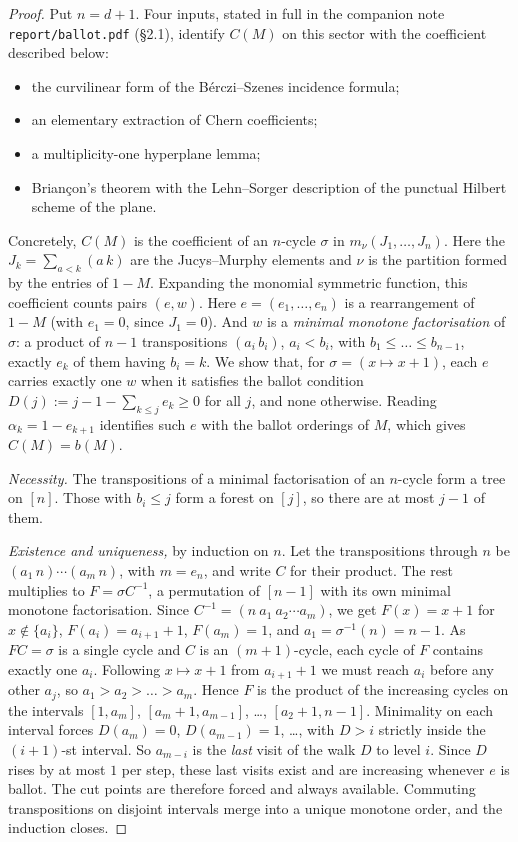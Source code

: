 \documentclass[11pt,a4paper]{article}
\theoremstyle{plain}
\theoremstyle{definition}
\theoremstyle{remark}
\begin{document}
\begin{proof}
Put $n = d+1$. Four inputs, stated in full in the companion note \texttt{report/ballot.pdf}
(\S2.1), identify $C(M)$ on this sector with the coefficient described below:
\begin{itemize}[nosep]
\item the curvilinear form of the B\'erczi--Szenes incidence formula;
\item an elementary extraction of Chern coefficients;
\item a multiplicity-one hyperplane lemma;
\item Brian\c{c}on's theorem with the Lehn--Sorger description of the punctual Hilbert scheme of the
  plane.
\end{itemize}
Concretely, $C(M)$ is the
coefficient of an $n$-cycle $\sigma$ in $m_\nu(J_1, \dots, J_n)$. Here the $J_k = \sum_{a<k}(a\,k)$ are the
Jucys--Murphy elements and $\nu$ is the partition formed by the entries of $1 - M$. Expanding the
monomial symmetric function, this coefficient counts pairs $(e, w)$. Here $e = (e_1, \dots, e_n)$
is a rearrangement of $1 - M$ (with $e_1 = 0$, since $J_1 = 0$). And $w$ is a \emph{minimal
monotone factorisation} of $\sigma$: a product of $n-1$ transpositions $(a_i\,b_i)$, $a_i < b_i$,
with $b_1 \le \dots \le b_{n-1}$, exactly $e_k$ of them having $b_i = k$. We show that, for
$\sigma = (x \mapsto x+1)$, each $e$ carries exactly one $w$ when it satisfies the ballot condition
$D(j) := j - 1 - \sum_{k \le j} e_k \ge 0$ for all $j$, and none otherwise. Reading $\alpha_k = 1 -
e_{k+1}$ identifies such $e$ with the ballot orderings of $M$, which gives $C(M) = b(M)$.

\emph{Necessity.} The transpositions of a minimal factorisation of an $n$-cycle form a tree on
$[n]$. Those with $b_i \le j$ form a forest on $[j]$, so there are at most $j-1$ of them.

\emph{Existence and uniqueness,} by induction on $n$. Let the transpositions through $n$ be $(a_1\,n)
\cdots (a_m\,n)$, with $m = e_n$, and write $C$ for their product. The rest multiplies to
$F = \sigma C^{-1}$, a permutation of $[n-1]$ with its own minimal monotone factorisation. Since
$C^{-1} = (n\ a_1\ a_2 \cdots a_m)$, we get $F(x) = x+1$ for $x \notin \{a_i\}$, $F(a_i) = a_{i+1} + 1$,
$F(a_m) = 1$, and $a_1 = \sigma^{-1}(n) = n-1$. As $FC = \sigma$ is a single cycle and $C$ is an
$(m+1)$-cycle, each cycle of $F$ contains exactly one $a_i$. Following $x \mapsto x+1$ from
$a_{i+1}+1$ we must reach $a_i$ before any other $a_j$, so $a_1 > a_2 > \dots > a_m$. Hence $F$ is
the product of the increasing cycles on the intervals $[1, a_m]$, $[a_m+1, a_{m-1}]$, \dots,
$[a_2+1, n-1]$. Minimality on each interval forces $D(a_m) = 0$, $D(a_{m-1}) = 1$, \dots, with
$D > i$ strictly inside the $(i+1)$-st interval. So $a_{m-i}$ is the \emph{last} visit of the walk
$D$ to level $i$. Since $D$ rises by at most $1$ per step, these last visits exist and are
increasing whenever $e$ is ballot. The cut points are therefore forced and always available.
Commuting transpositions on disjoint intervals merge into a unique monotone order, and the
induction closes.


\end{proof}
\end{document}

